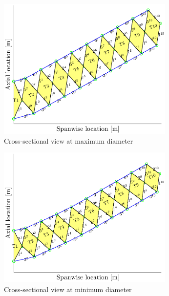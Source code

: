 \begin{figure}[h]
	\centering

	\begin{subfigure}[b]{0.45\textwidth}
		\includegraphics[width=0.96\textwidth]{./Figure/Structure/shape_long.eps}
		\caption{Cross-sectional view at maximum diameter}
		\label{fig:shapel}
	\end{subfigure}
	\begin{subfigure}[b]{0.45\textwidth}
		\includegraphics[width=0.96\textwidth]{./Figure/Structure/shape_short.eps}
		\caption{Cross-sectional view at minimum diameter}
		\label{fig:shapes}
	\end{subfigure}
\begin{subfigure}[c]{0.5\textwidth}

\end{subfigure}
\end{figure}
